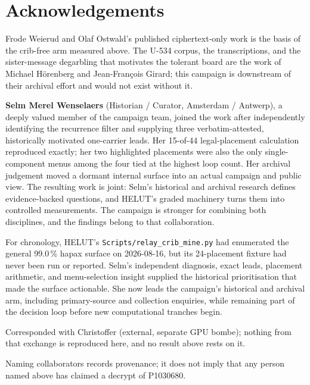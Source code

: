 \documentclass[11pt,a4paper]{article}
\begin{document}
\section*{Acknowledgements}

Frode Weierud and Olaf Ostwald's published ciphertext-only work is the basis of
the crib-free arm measured above.
The U-534 corpus, the transcriptions, and the sister-message degarbling that
motivates the tolerant board are the work of Michael Hörenberg and
Jean-François Girard; this campaign is downstream of their archival effort and
would not exist without it.

\textbf{Selm Merel Wenselaers} (Historian / Curator, Amsterdam / Antwerp),
a deeply valued member of the campaign team, joined the work after independently identifying the recurrence filter
and supplying three verbatim-attested, historically motivated one-carrier leads.
Her 15-of-44 legal-placement calculation reproduced exactly; her two highlighted
placements were also the only single-component menus among the four tied at the
highest loop count. Her archival judgement moved a dormant internal surface into
an actual campaign and public view. The resulting work is joint: Selm's historical
and archival research defines evidence-backed questions, and HELUT's graded
machinery turns them into controlled measurements. The campaign is stronger for
combining both disciplines, and the findings belong to that collaboration.

For chronology, HELUT's \texttt{Scripts/relay\_crib\_mine.py} had enumerated the
general 99.0\,\% hapax surface on 2026-08-16, but its 24-placement fixture had
never been run or reported. Selm's independent diagnosis, exact leads, placement
arithmetic, and menu-selection insight supplied the historical prioritisation
that made the surface actionable. She now leads the campaign's historical and
archival arm, including primary-source and collection enquiries, while remaining
part of the decision loop before new computational tranches begin.

Corresponded with Christoffer (external, separate GPU bombe); nothing from that
exchange is reproduced here, and no result above rests on it.

Naming collaborators records provenance; it does not imply that any person named
above has claimed a decrypt of P1030680.
\end{document}
